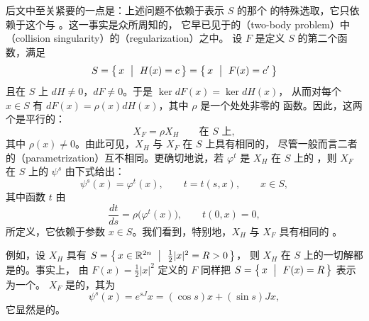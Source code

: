后文中至关紧要的一点是：上述问题不依赖于表示 $S$ 的那个%
\trHamiltonianFunction{}的特殊选取，它只依赖于这个\trHypersurface{}与%
\trSymplecticStructure。这一事实是众所周知的，%
它早已见于\trCelestialMechanics{}的\textbf{\trTwoBodyProblem}（two-body problem）中%
\textbf{\trCollision\trSingularity}（collision singularity）的\textbf{\trRegularization}（regularization）之中。%
设 $F$ 是定义 $S$ 的第二个函数，满足
\begin{equation}\label{eq:two-defining-functions}
S=\bigl\{\,x\ \bigm|\ H(x)=c\,\bigr\}=\bigl\{\,x\ \bigm|\ F(x)=c'\,\bigr\}
\end{equation}
且在 $S$ 上 $dH\neq0$，$dF\neq0$。于是 $\ker dF(x)=\ker dH(x)$，%
从而对每个 $x\in S$ 有 $dF(x)=\rho(x)dH(x)$，其中 $\rho$ 是一个处处非零的%
\trSmooth{}函数。因此，这两个\trHamiltonianVectorField{}是平行的：
\begin{equation}\label{eq:parallel-vector-fields}
X_{F}=\rho X_{H}\qquad\text{在 $S$ 上},
\end{equation}
其中 $\rho(x)\neq0$。由此可见，$X_{H}$ 与 $X_{F}$ 在 $S$ 上具有相同的\trOrbit，%
尽管一般而言二者的\textbf{\trParametrization}（parametrization）互不相同。更确切地说，若 $\varphi^{t}$ 是 $X_{H}$ 在 $S$ 上的%
\trFlow，则 $X_{F}$ 在 $S$ 上的\trFlow{} $\psi^{s}$ 由下式给出：
\begin{equation}\label{eq:flow-reparametrization}
\psi^{s}(x)=\varphi^{t}(x),\qquad t=t(s,x),\qquad x\in S,
\end{equation}
其中函数 $t$ 由\trDifferentialEquation
\[
\frac{dt}{ds}=\rho\bigl(\varphi^{t}(x)\bigr),\qquad t(0,x)=0,
\]
所定义，它依赖于参数 $x\in S$。我们看到，特别地，$X_{H}$ 与 $X_{F}$ 具有相同的%
\trPeriodicOrbit。

例如，设 $X_{H}$ 具有\trEnergySurface{}%
$S=\bigl\{\,x\in\R^{2n}\ \bigm|\ \tfrac{1}{2}|x|^{2}=R>0\,\bigr\}$，%
则 $X_{H}$ 在 $S$ 上的一切解都是\trPeriodic{}的。事实上，%
由 $F(x)=\tfrac{1}{2}|x|^{2}$ 定义的\trHamiltonianFunction{} $F$ 同样把%
$S=\bigl\{\,x\ \bigm|\ F(x)=R\,\bigr\}$ 表示为一个\trRegular\trEnergySurface。%
\trVectorField{} $X_{F}$ 是\trLinear{}的，其\trFlow{}为
\[
\psi^{s}(x)=e^{sJ}x=(\cos s)x+(\sin s)Jx,
\]
它显然是\trPeriodic{}的。

